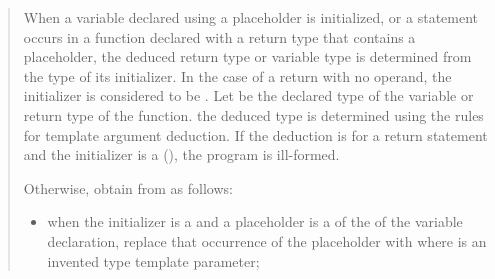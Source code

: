 \begin{quote}
\pnum
When a variable declared using a placeholder is initialized, or a 
 statement occurs in a function declared with a return type
that contains a placeholder, the deduced return type or variable type 
is determined from the type of its initializer.
%
In the case of a return with no operand, the initializer is considered to 
be .
%
Let  be the declared type of the variable or return type of the 
function.
%
the deduced type is determined using the rules for template argument
deduction. 
%
If the deduction is for a return statement and the initializer is a 
 (), the program is
ill-formed. 
%

\begin{addedblock}
Otherwise, obtain  from  as follows:
\begin{itemize}
\item when the initializer is a 
and a placeholder is a  of the 
 of the variable declaration, replace that 
occurrence of the placeholder with 
where  is an invented type template parameter;


\end{itemize}
\end{addedblock}
\end{quote}

